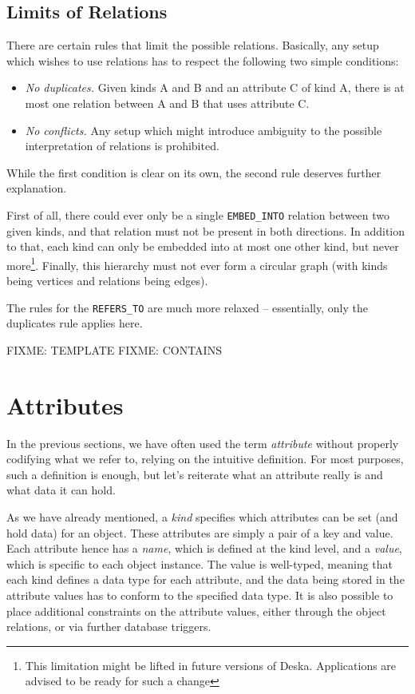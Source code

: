 \documentclass[deska]{subfiles}
\begin{document}
\subsection{Limits of Relations}

There are certain rules that limit the possible relations.  Basically, any setup which wishes to use relations has to
respect the following two simple conditions:

\begin{itemize}
    \item {\em No duplicates.} Given kinds A and B and an attribute C of kind A, there is at most one relation between A
        and B that uses attribute C.
    \item {\em No conflicts.} Any setup which might introduce ambiguity to the possible interpretation of relations is
        prohibited.
\end{itemize}

While the first condition is clear on its own, the second rule deserves further explanation.

First of all, there could ever only be a single {\tt EMBED\_INTO} relation between two given kinds, and that relation
must not be present in both directions.  In addition to that, each kind can only be embedded into at most one other
kind, but never more\footnote{This limitation might be lifted in future versions of Deska.  Applications are advised to
be ready for such a change}.  Finally, this hierarchy must not ever form a circular graph (with kinds being vertices and
relations being edges).

The rules for the {\tt REFERS\_TO} are much more relaxed -- essentially, only the {\no duplicates} rule applies here.

FIXME: TEMPLATE
FIXME: CONTAINS

\section{Attributes}

In the previous sections, we have often used the term {\em attribute} without properly codifying what we refer to,
relying on the intuitive definition.  For most purposes, such a definition is enough, but let's reiterate what an
attribute really is and what data it can hold.

As we have already mentioned, a {\em kind} specifies which attributes can be set (and hold data) for an object.  These
attributes are simply a pair of a key and value.  Each attribute hence has a {\em name}, which is defined at the kind
level, and a {\em value}, which is specific to each object instance.  The value is well-typed, meaning that each kind
defines a data type for each attribute, and the data being stored in the attribute values has to conform to the
specified data type.  It is also possible to place additional constraints on the attribute values, either through the
object relations, or via further database triggers.
\end{document}
